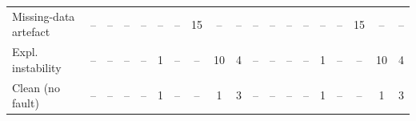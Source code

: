 \begin{table}[t]
\begin{tabular}{l|ccccccccc|ccccccccc}
Missing-data artefact & -- & -- & -- & -- & -- & -- & \cellcolor[RGB]{205,226,251}\textcolor[HTML]{04050C}{15} & -- & -- & -- & -- & -- & -- & -- & -- & \cellcolor[RGB]{205,226,251}\textcolor[HTML]{04050C}{15} & -- & -- \\
Expl. instability & -- & -- & -- & -- & \cellcolor[RGB]{17,40,76}\textcolor[HTML]{EEF0F6}{1} & -- & -- & \cellcolor[RGB]{92,156,234}\textcolor[HTML]{04050C}{10} & \cellcolor[RGB]{23,76,143}\textcolor[HTML]{EEF0F6}{4} & -- & -- & -- & -- & \cellcolor[RGB]{17,40,76}\textcolor[HTML]{EEF0F6}{1} & -- & -- & \cellcolor[RGB]{92,156,234}\textcolor[HTML]{04050C}{10} & \cellcolor[RGB]{23,76,143}\textcolor[HTML]{EEF0F6}{4} \\
Clean (no fault) & -- & -- & -- & -- & \cellcolor[RGB]{17,40,76}\textcolor[HTML]{EEF0F6}{1} & -- & -- & \cellcolor[RGB]{17,40,76}\textcolor[HTML]{EEF0F6}{1} & \cellcolor[RGB]{17,64,124}\textcolor[HTML]{EEF0F6}{3} & -- & -- & -- & -- & \cellcolor[RGB]{17,40,76}\textcolor[HTML]{EEF0F6}{1} & -- & -- & \cellcolor[RGB]{17,40,76}\textcolor[HTML]{EEF0F6}{1} & \cellcolor[RGB]{17,64,124}\textcolor[HTML]{EEF0F6}{3} \\
\bottomrule
\end{tabular}
\end{table}
